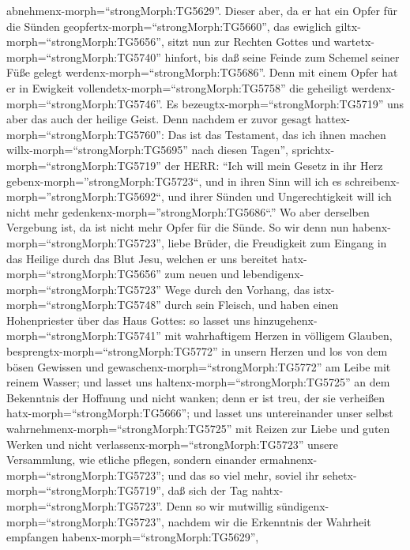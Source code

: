 abnehmenx-morph=``strongMorph:TG5629''.  Dieser aber, da er
hat ein Opfer für die Sünden geopfertx-morph=``strongMorph:TG5660'', das
ewiglich giltx-morph=``strongMorph:TG5656'', sitzt nun zur Rechten
Gottes  und wartetx-morph=``strongMorph:TG5740'' hinfort,
bis daß seine Feinde zum Schemel seiner Füße gelegt
werdenx-morph=``strongMorph:TG5686''.  Denn mit einem Opfer
hat er in Ewigkeit vollendetx-morph=``strongMorph:TG5758'' die geheiligt
werdenx-morph=``strongMorph:TG5746''.  Es
bezeugtx-morph=``strongMorph:TG5719'' uns aber das auch der heilige
Geist. Denn nachdem er zuvor gesagt hattex-morph=``strongMorph:TG5760'':
 Das ist das Testament, das ich ihnen machen
willx-morph=``strongMorph:TG5695'' nach diesen Tagen'',
sprichtx-morph=``strongMorph:TG5719'' der HERR: ``Ich will mein Gesetz
in ihr Herz gebenx-morph=''strongMorph:TG5723``, und in ihren Sinn will
ich es schreibenx-morph=''strongMorph:TG5692``,  und ihrer
Sünden und Ungerechtigkeit will ich nicht mehr
gedenkenx-morph=''strongMorph:TG5686``.''  Wo aber
derselben Vergebung ist, da ist nicht mehr Opfer für die Sünde.
 So wir denn nun habenx-morph=``strongMorph:TG5723'', liebe
Brüder, die Freudigkeit zum Eingang in das Heilige durch das Blut Jesu,
 welchen er uns bereitet hatx-morph=``strongMorph:TG5656''
zum neuen und lebendigenx-morph=``strongMorph:TG5723'' Wege durch den
Vorhang, das istx-morph=``strongMorph:TG5748'' durch sein Fleisch,
 und haben einen Hohenpriester über das Haus Gottes:
 so lasset uns hinzugehenx-morph=``strongMorph:TG5741'' mit
wahrhaftigem Herzen in völligem Glauben,
besprengtx-morph=``strongMorph:TG5772'' in unsern Herzen und los von dem
bösen Gewissen und gewaschenx-morph=``strongMorph:TG5772'' am Leibe mit
reinem Wasser;  und lasset uns
haltenx-morph=``strongMorph:TG5725'' an dem Bekenntnis der Hoffnung und
nicht wanken; denn er ist treu, der sie verheißen
hatx-morph=``strongMorph:TG5666'';  und lasset uns
untereinander unser selbst wahrnehmenx-morph=``strongMorph:TG5725'' mit
Reizen zur Liebe und guten Werken  und nicht
verlassenx-morph=``strongMorph:TG5723'' unsere Versammlung, wie etliche
pflegen, sondern einander ermahnenx-morph=``strongMorph:TG5723''; und
das so viel mehr, soviel ihr sehetx-morph=``strongMorph:TG5719'', daß
sich der Tag nahtx-morph=``strongMorph:TG5723''.  Denn so
wir mutwillig sündigenx-morph=``strongMorph:TG5723'', nachdem wir die
Erkenntnis der Wahrheit empfangen habenx-morph=``strongMorph:TG5629'',
